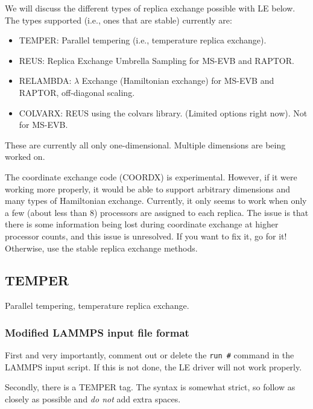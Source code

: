 \documentclass[10pt]{article}
\begin{document}
We will discuss the different types of replica exchange possible with LE below.
The types supported (i.e., ones that are stable) currently are:
\begin{itemize}
	\item TEMPER: 	Parallel tempering (i.e., temperature replica exchange).
	\item REUS:		Replica Exchange Umbrella Sampling for MS-EVB and RAPTOR.
	\item RELAMBDA:	$\lambda$ Exchange (Hamiltonian exchange) for MS-EVB and RAPTOR, off-diagonal scaling.
	\item COLVARX:	REUS using the colvars library. (Limited options right now). Not for MS-EVB.
\end{itemize}
These are currently all only one-dimensional. Multiple dimensions are being worked on.

The coordinate exchange code (COORDX) is experimental. However, if it were working more properly,
it would be able to support arbitrary dimensions and many types of Hamiltonian exchange. Currently,
it only seems to work when only a few (about less than 8) processors are assigned to each replica.
The issue is that there is some information being lost during coordinate exchange at higher processor
counts, and this issue is unresolved. If you want to fix it, go for it! Otherwise, use the stable
replica exchange methods.

\subsection{TEMPER}

Parallel tempering, temperature replica exchange.

\subsubsection{Modified LAMMPS input file format}

First and very importantly, comment out
or delete the \texttt{run \#} command in the LAMMPS input script. If this is not done,
the LE driver will not work properly. 

Secondly, there is a TEMPER tag. The syntax is somewhat strict,
so follow as closely as possible and {\em do not} add extra spaces.
\end{document}
